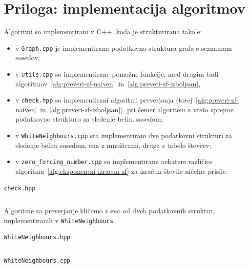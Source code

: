 \documentclass[12pt,a4paper,twoside]{article}
\newcommand{\mintedtitle}[1]{\noindent \texttt{#1} \vspace{-5mm}}
\theoremstyle{definition} %
\theoremstyle{plain} %
\numberwithin{equation}{section}  %
\begin{document}
\section{Priloga: implementacija algoritmov}
\label{sec:algoritmi}

Algoritmi so implementirani v C++, koda je strukturirana takole:
\begin{itemize}
    \item v \texttt{Graph.cpp} je implementirana podatkovna struktura grafa s seznamom sosedov;
    \item v \texttt{utils.cpp} so implementirane pomožne funkcije, med drugim tudi algoritmov~\ref{alg:preveri-zf-naiven}~in~\ref{alg:preveri-zf-izboljsan},
    \item v \texttt{check.hpp} so implementirani algoritmi preverjanja (torej~\ref{alg:preveri-zf-naiven}~in~\ref{alg:preveri-zf-izboljsan}), pri čemer algoritem z vrsto sprejme podatkovno strukturo za sledenje belim sosedom;
    \item v \texttt{WhiteNeighbours.cpp} sta implementirani dve podatkovni strukturi za sledenje belim sosedom, ena z množicami, druga s tabelo števcev;
    \item v \texttt{zero\_forcing\_number.cpp} so implementirane nekatere različice algoritma~\ref{alg:eksponentni-izracun-zf} za izračun števile ničelne prisile.
\end{itemize}

\mintedtitle{check.hpp}
\inputminted[firstline=11, lastline=95]{c++}{koda/check.hpp}

Algoritme za preverjanje kličemo z eno od dveh podatkovnih struktur, implementiranih v \texttt{WhiteNeighbours}.

\mintedtitle{WhiteNeighbours.hpp}
\inputminted[firstline=7]{c++}{koda/WhiteNeighbours.hpp}
\mintedtitle{WhiteNeighbours.cpp}
\inputminted[firstline=2]{c++}{koda/WhiteNeighbours.cpp}
\end{document}

